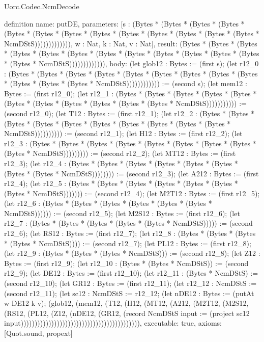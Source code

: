 \begin{lexlean}{Uorc.Codec.NcmDecode}
\begin{semanticmodule}
definition{
  name: putDE,
  parameters: [s : (Bytes * (Bytes * (Bytes * (Bytes * (Bytes * (Bytes * (Bytes * (Bytes * (Bytes * (Bytes * (Bytes * (Bytes * (Bytes * NcmDStS))))))))))))), w : Nat, k : Nat, v : Nat],
  result: (Bytes * (Bytes * (Bytes * (Bytes * (Bytes * (Bytes * (Bytes * (Bytes * (Bytes * (Bytes * (Bytes * (Bytes * (Bytes * NcmDStS))))))))))))),
  body: (let glob12 : Bytes := (first s); (let r12_0 : (Bytes * (Bytes * (Bytes * (Bytes * (Bytes * (Bytes * (Bytes * (Bytes * (Bytes * (Bytes * (Bytes * (Bytes * NcmDStS)))))))))))) := (second s); (let mem12 : Bytes := (first r12_0); (let r12_1 : (Bytes * (Bytes * (Bytes * (Bytes * (Bytes * (Bytes * (Bytes * (Bytes * (Bytes * (Bytes * (Bytes * NcmDStS))))))))))) := (second r12_0); (let T12 : Bytes := (first r12_1); (let r12_2 : (Bytes * (Bytes * (Bytes * (Bytes * (Bytes * (Bytes * (Bytes * (Bytes * (Bytes * (Bytes * NcmDStS)))))))))) := (second r12_1); (let H12 : Bytes := (first r12_2); (let r12_3 : (Bytes * (Bytes * (Bytes * (Bytes * (Bytes * (Bytes * (Bytes * (Bytes * (Bytes * NcmDStS))))))))) := (second r12_2); (let MT12 : Bytes := (first r12_3); (let r12_4 : (Bytes * (Bytes * (Bytes * (Bytes * (Bytes * (Bytes * (Bytes * (Bytes * NcmDStS)))))))) := (second r12_3); (let A212 : Bytes := (first r12_4); (let r12_5 : (Bytes * (Bytes * (Bytes * (Bytes * (Bytes * (Bytes * (Bytes * NcmDStS))))))) := (second r12_4); (let M2T12 : Bytes := (first r12_5); (let r12_6 : (Bytes * (Bytes * (Bytes * (Bytes * (Bytes * (Bytes * NcmDStS)))))) := (second r12_5); (let M2S12 : Bytes := (first r12_6); (let r12_7 : (Bytes * (Bytes * (Bytes * (Bytes * (Bytes * NcmDStS))))) := (second r12_6); (let RS12 : Bytes := (first r12_7); (let r12_8 : (Bytes * (Bytes * (Bytes * (Bytes * NcmDStS)))) := (second r12_7); (let PL12 : Bytes := (first r12_8); (let r12_9 : (Bytes * (Bytes * (Bytes * NcmDStS))) := (second r12_8); (let Z12 : Bytes := (first r12_9); (let r12_10 : (Bytes * (Bytes * NcmDStS)) := (second r12_9); (let DE12 : Bytes := (first r12_10); (let r12_11 : (Bytes * NcmDStS) := (second r12_10); (let GR12 : Bytes := (first r12_11); (let r12_12 : NcmDStS := (second r12_11); (let sc12 : NcmDStS := r12_12; (let nDE12 : Bytes := (putAt w DE12 k v); (glob12, (mem12, (T12, (H12, (MT12, (A212, (M2T12, (M2S12, (RS12, (PL12, (Z12, (nDE12, (GR12, (record NcmDStS {input := (project sc12 input)})))))))))))))))))))))))))))))))))))))))))),
  executable: true,
  axioms: [Quot.sound, propext]
}


\end{semanticmodule}
\end{lexlean}
